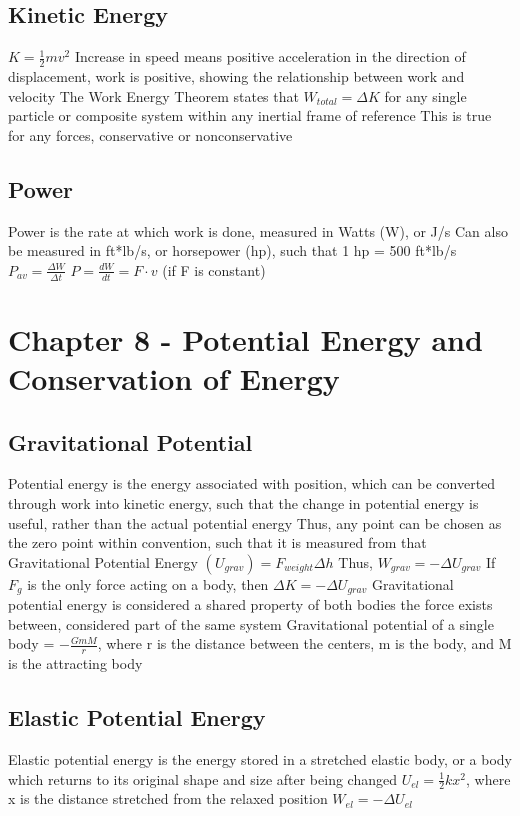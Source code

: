 \documentclass[11 pt, twoside]{article}
\newenvironment{outline*}
{
	\begin{outline}[enumerate]
	}
	{\end{outline}
}
\begin{document}
\subsection{Kinetic Energy}
\begin{outline*}
\1 $K = \frac{1}{2}mv^2$
\1 Increase in speed means positive acceleration in the direction of displacement, work is positive, showing the relationship between work and velocity
\1 The Work Energy Theorem states that $W_{total} = \Delta K$ for any single particle or composite system within any inertial frame of reference
\2 This is true for any forces, conservative or nonconservative
\end{outline*}
\subsection{Power}
\begin{outline*}
\1 Power is the rate at which work is done, measured in Watts (W), or J/s
\2 Can also be measured in ft*lb/s, or horsepower (hp), such that 1 hp = 500 ft*lb/s
\1 $P_{av} = \frac{\Delta W}{\Delta t}$
\1 $P = \frac{dW}{dt} = F \cdot v$ (if F is constant)
\end{outline*}
\section{Chapter 8 - Potential Energy and Conservation of Energy}
\subsection{Gravitational Potential}
\begin{outline*}
\1 Potential energy is the energy associated with position, which can be converted through work into kinetic energy, such that the change in potential energy is useful, rather than the actual potential energy
\2 Thus, any point can be chosen as the zero point within convention, such that it is measured from that
\1 Gravitational Potential Energy $(U_{grav}) = F_{weight}\Delta h$
\2 Thus, $W_{grav} = -\Delta U_{grav}$
\2 If $F_g$ is the only force acting on a body, then $\Delta K = -\Delta U_{grav}$
\2 Gravitational potential energy is considered a shared property of both bodies the force exists between, considered part of the same system
\2 Gravitational potential of a single body = $-\frac{GmM}{r}$, where r is the distance between the centers, m is the body, and M is the attracting body
\end{outline*}
\subsection{Elastic Potential Energy}
\begin{outline*}
\1 Elastic potential energy is the energy stored in a stretched elastic body, or a body which returns to its original shape and size after being changed
\2 $U_{el} = \frac{1}{2}kx^2$, where x is the distance stretched from the relaxed position
\2 $W_{el} = -\Delta U_{el}$
\end{outline*}
\end{document}

